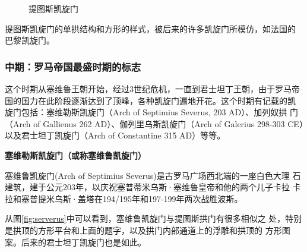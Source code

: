 \documentclass[a4paper,dvipdfm]{article}
\begin{document}
\begin{figure}[hbt!]
  \centering
  \caption{提图斯凯旋门}
\end{figure}



提图斯凯旋门的单拱结构和方形的样式，被后来的许多凯旋门所模仿，如法国的
巴黎凯旋门。

\clearpage

\subsubsection{中期：罗马帝国最盛时期的标志}

这个时期从塞维鲁王朝开始，经过3世纪危机，一直到君士坦丁王朝，由于罗马帝
国的国力在此阶段逐渐达到了顶峰，各种凯旋门遍地开花。这个时期有记载的凯
旋门包括：塞维勒斯凯旋门（Arch of Septimius Severus, 203 AD）、加列奴拱
门（Arch of Gallienus 262 AD）、伽列里乌斯凯旋门（Arch of Galerius
298-303 CE）以及君士坦丁凯旋门（Arch of Constantine 315 AD）等等。

\textbf{塞维勒斯凯旋门（或称塞维鲁凯旋门）}

塞维鲁凯旋门(Arch of Septimius Severus)是古罗马广场西北端的一座白色大理
石建筑，建于公元203年，以庆祝塞普蒂米乌斯·塞维鲁皇帝和他的两个儿子卡拉
卡拉和塞普提米乌斯·盖塔在194/195年和197-199年两次战胜波斯。

从图\ref{fig:serverus}中可以看到，塞维鲁凯旋门与提图斯拱门有很多相似之
处，特别是拱顶的方形平台和上面的题字，以及拱门内部通道上的浮雕和拱顶的
方形图案。后来的君士坦丁凯旋门也是如此。
\end{document}
